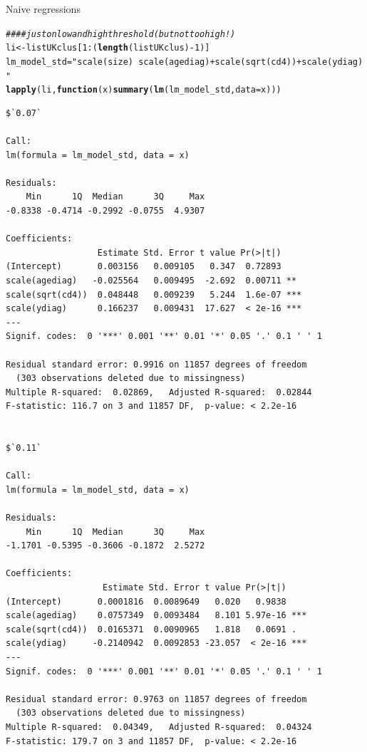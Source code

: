 \documentclass[]{revtex4}\usepackage[]{graphicx}\usepackage[]{color}
\makeatletter
\newcommand{\hlnum}[1]{\textcolor[rgb]{0.686,0.059,0.569}{#1}}%
\newcommand{\hlstr}[1]{\textcolor[rgb]{0.192,0.494,0.8}{#1}}%
\newcommand{\hlcom}[1]{\textcolor[rgb]{0.678,0.584,0.686}{\textit{#1}}}%
\newcommand{\hlopt}[1]{\textcolor[rgb]{0,0,0}{#1}}%
\newcommand{\hlstd}[1]{\textcolor[rgb]{0.345,0.345,0.345}{#1}}%
\newcommand{\hlkwa}[1]{\textcolor[rgb]{0.161,0.373,0.58}{\textbf{#1}}}%
\newcommand{\hlkwb}[1]{\textcolor[rgb]{0.69,0.353,0.396}{#1}}%
\newcommand{\hlkwc}[1]{\textcolor[rgb]{0.333,0.667,0.333}{#1}}%
\newcommand{\hlkwd}[1]{\textcolor[rgb]{0.737,0.353,0.396}{\textbf{#1}}}%
\newenvironment{kframe}{%
 \def\at@end@of@kframe{}%
 \ifinner\ifhmode%
  \def\at@end@of@kframe{\end{minipage}}%
  \begin{minipage}{\columnwidth}%
 \fi\fi%
 \def\FrameCommand##1{\hskip\@totalleftmargin \hskip-\fboxsep
 \colorbox{shadecolor}{##1}\hskip-\fboxsep
     \hskip-\linewidth \hskip-\@totalleftmargin \hskip\columnwidth}%
 \MakeFramed {\advance\hsize-\width
   \@totalleftmargin\z@ \linewidth\hsize
   \@setminipage}}%
 {\par\unskip\endMakeFramed%
 \at@end@of@kframe}
\newenvironment{knitrout}{}{} %
\makeatother
\begin{document}
Naive regressions
\begin{knitrout}
\color{fgcolor}\begin{kframe}
\begin{alltt}
\hlcom{#### just on low and high threshold (but not too high !)}
\hlstd{li} \hlkwb{<-} \hlstd{listUKclus[} \hlnum{1}\hlopt{:}\hlstd{(}\hlkwd{length}\hlstd{(listUKclus)}\hlopt{-}\hlnum{1}\hlstd{) ]}
\hlstd{lm_model_std} \hlkwb{=} \hlstr{"scale(size) ~ scale(agediag) + scale(sqrt(cd4)) +  scale(ydiag)"}
\hlkwd{lapply}\hlstd{(li,} \hlkwa{function}\hlstd{(}\hlkwc{x}\hlstd{)} \hlkwd{summary}\hlstd{(}\hlkwd{lm}\hlstd{(lm_model_std,} \hlkwc{data} \hlstd{= x)))}
\end{alltt}
\begin{verbatim}
$`0.07`

Call:
lm(formula = lm_model_std, data = x)

Residuals:
    Min      1Q  Median      3Q     Max 
-0.8338 -0.4714 -0.2992 -0.0755  4.9307 

Coefficients:
                  Estimate Std. Error t value Pr(>|t|)    
(Intercept)       0.003156   0.009105   0.347  0.72893    
scale(agediag)   -0.025564   0.009495  -2.692  0.00711 ** 
scale(sqrt(cd4))  0.048448   0.009239   5.244  1.6e-07 ***
scale(ydiag)      0.166237   0.009431  17.627  < 2e-16 ***
---
Signif. codes:  0 '***' 0.001 '**' 0.01 '*' 0.05 '.' 0.1 ' ' 1

Residual standard error: 0.9916 on 11857 degrees of freedom
  (303 observations deleted due to missingness)
Multiple R-squared:  0.02869,	Adjusted R-squared:  0.02844 
F-statistic: 116.7 on 3 and 11857 DF,  p-value: < 2.2e-16


$`0.11`

Call:
lm(formula = lm_model_std, data = x)

Residuals:
    Min      1Q  Median      3Q     Max 
-1.1701 -0.5395 -0.3606 -0.1872  2.5272 

Coefficients:
                   Estimate Std. Error t value Pr(>|t|)    
(Intercept)       0.0001816  0.0089649   0.020   0.9838    
scale(agediag)    0.0757349  0.0093484   8.101 5.97e-16 ***
scale(sqrt(cd4))  0.0165371  0.0090965   1.818   0.0691 .  
scale(ydiag)     -0.2140942  0.0092853 -23.057  < 2e-16 ***
---
Signif. codes:  0 '***' 0.001 '**' 0.01 '*' 0.05 '.' 0.1 ' ' 1

Residual standard error: 0.9763 on 11857 degrees of freedom
  (303 observations deleted due to missingness)
Multiple R-squared:  0.04349,	Adjusted R-squared:  0.04324 
F-statistic: 179.7 on 3 and 11857 DF,  p-value: < 2.2e-16



\end{verbatim}
\end{kframe}
\end{knitrout}
\end{document}
